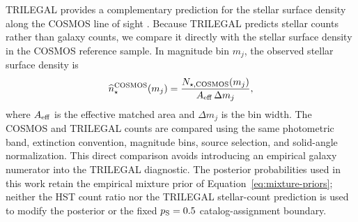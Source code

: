 TRILEGAL provides a complementary prediction for the stellar surface density
along the COSMOS line of sight \citep{Girardi2005TRILEGAL,
DalTio2022TRILEGAL}. Because TRILEGAL predicts stellar counts rather than
galaxy counts, we compare it directly with the stellar surface density in the
COSMOS reference sample. In magnitude bin $m_j$, the observed stellar surface
density is
\begin{equation}
    \widehat{n}_{\star}^{\rm COSMOS}(m_j)
    =\frac{N_{\star,{\rm COSMOS}}(m_j)}
           {A_{\rm eff}\,\Delta m_j},
    \label{eq:cosmos-star-counts}
\end{equation}
where $A_{\rm eff}$ is the effective matched area and $\Delta m_j$ is the bin
width. The COSMOS and TRILEGAL counts are compared using the same photometric
band, extinction convention, magnitude bins, source selection, and
solid-angle normalization. This direct comparison avoids introducing an
empirical galaxy numerator into the TRILEGAL diagnostic. The posterior
probabilities used in this work retain the empirical mixture prior of
Equation~\ref{eq:mixture-priors}; neither the HST count ratio nor the TRILEGAL
stellar-count prediction is used to modify the posterior or the fixed
$p_{\rm S}=0.5$ catalog-assignment boundary.

\FloatBarrier

